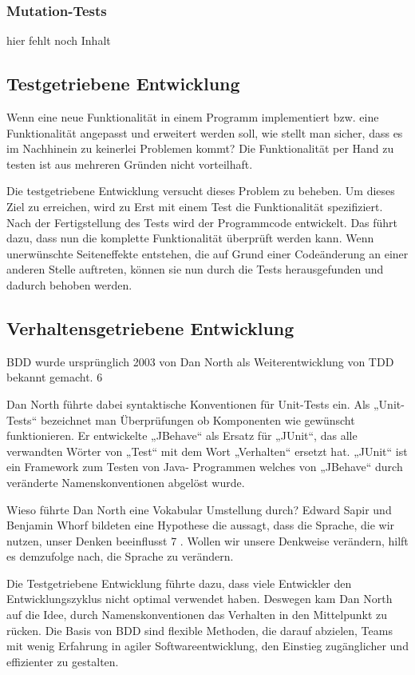 \subsubsection{Mutation-Tests}

hier fehlt noch Inhalt

\subsection{Testgetriebene Entwicklung}
Wenn eine neue Funktionalität in einem Programm implementiert bzw. eine Funktionalität angepasst und erweitert werden soll, wie stellt man sicher, dass es im Nachhinein
zu keinerlei Problemen kommt? Die Funktionalität per Hand zu testen ist aus mehreren Gründen nicht vorteilhaft.

Die testgetriebene Entwicklung versucht dieses Problem zu beheben. Um dieses Ziel zu erreichen, wird zu Erst mit einem Test die Funktionalität spezifiziert. Nach der
Fertigstellung des Tests wird der Programmcode entwickelt. Das führt dazu, dass nun die komplette Funktionalität überprüft werden kann. Wenn unerwünschte Seiteneffekte 
entstehen, die auf Grund einer Codeänderung an einer anderen Stelle auftreten, können sie nun durch die Tests herausgefunden und dadurch
behoben werden.

\subsection{Verhaltensgetriebene Entwicklung}
BDD wurde ursprünglich 2003 von Dan North als Weiterentwicklung von TDD bekannt gemacht. 6

Dan North führte dabei syntaktische Konventionen für Unit-Tests ein. Als „Unit-Tests“ bezeichnet man Überprüfungen ob Komponenten wie gewünscht funktionieren. Er
entwickelte „JBehave“ als Ersatz für „JUnit“, das alle verwandten Wörter von „Test“ mit dem Wort „Verhalten“ ersetzt hat. „JUnit“ ist ein Framework zum Testen von Java-
Programmen welches von „JBehave“ durch veränderte Namenskonventionen abgelöst wurde.

Wieso führte Dan North eine Vokabular Umstellung durch? Edward Sapir und Benjamin Whorf bildeten eine Hypothese die aussagt, dass die Sprache, die wir nutzen, unser 
Denken beeinflusst 7 . Wollen wir unsere Denkweise verändern, hilft es demzufolge nach, die Sprache zu verändern.

Die Testgetriebene Entwicklung führte dazu, dass viele Entwickler den Entwicklungszyklus nicht optimal verwendet haben. Deswegen kam Dan North auf die Idee, durch
Namenskonventionen das Verhalten in den Mittelpunkt zu rücken. Die Basis von BDD sind flexible Methoden, die darauf abzielen, Teams mit wenig Erfahrung in agiler 
Softwareentwicklung, den Einstieg zugänglicher und effizienter zu gestalten.


